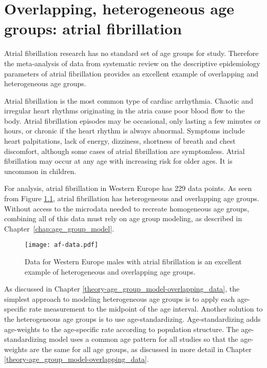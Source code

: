 \chapter{Overlapping, heterogeneous age groups: atrial fibrillation}
\label{applications-age_groups}

Atrial fibrillation research has no standard set of age groups for
study.  Therefore the meta-analysis of data from systematic review on
the descriptive epidemiology parameters of atrial fibrillation
provides an excellent example of overlapping and heterogeneous age
groups.

Atrial fibrillation is the most common type of cardiac arrhythmia.
Chaotic and irregular heart rhythms originating in the atria cause
poor blood flow to the body.  Atrial fibrillation episodes may be
occasional, only lasting a few minutes or hours, or chronic if the
heart rhythm is always abnormal.  Symptoms include heart palpitations,
lack of energy, dizziness, shortness of breath and chest discomfort,
although some cases of atrial fibrillation are symptomless.  Atrial
fibrillation may occur at any age with increasing risk for older ages.
It is uncommon in children. \cite{rich_epidemiology_2009,
  rho_asymptomoatic_2005, american_acc_2006, radford_atiral_1977}

For analysis, atrial fibrillation in Western Europe has 229 data
points.  As seen from Figure \ref{fig:app-af data}, atrial
fibrillation has heterogeneous and overlapping age groups.  Without
access to the microdata needed to recreate homogeneous age groups, combining all of this data must rely on age group modeling, as described in Chapter~\ref{chap:age_group_model}.

    \begin{figure}[h]
        \begin{center}
            \texttt{[image: af-data.pdf]}
            \caption{Data for Western Europe males with atrial
              fibrillation is an excellent example of heterogeneous
              and overlapping age groups.}
            \label{fig:app-af data}
        \end{center}
    \end{figure}

As discussed in Chapter \ref{theory-age_group_model-overlapping_data},
the simplest approach to modeling heterogeneous age groups is to apply
each age-specific rate measurement to the midpoint of the age interval.  
Another solution to the heterogeneous age groups is to use age-standardizing.
Age-standardizing adds age-weights to the age-specific rate according
to population structure.  The age-standardizing model uses a common
age pattern for all studies so that the age-weights are the same for
all age groups, as discussed in more detail in Chapter
\ref{theory-age_group_model-overlapping_data}.  

